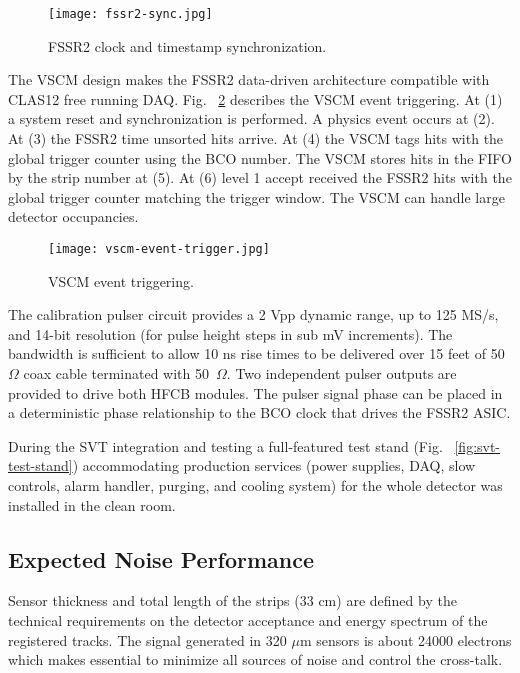 \begin{figure}[hbt] 
\centering 
\texttt{[image: fssr2-sync.jpg]}
\caption{FSSR2 clock and timestamp synchronization.}
\label{fig:fssr2-sync}
\end{figure}

The VSCM design makes the FSSR2 data-driven architecture compatible with CLAS12 free running DAQ. Fig. ~\ref{fig:vscm-event-trigger} describes the VSCM event triggering. At (1) a system reset and synchronization is performed. A physics event occurs at (2). At (3) the FSSR2 time unsorted hits arrive. At (4) the VSCM tags hits with the global trigger counter using the BCO number. The VSCM stores hits in the FIFO by the strip number at (5). At (6) level 1 accept received the FSSR2 hits with the global trigger counter matching the trigger window. The VSCM can handle large detector occupancies.

\begin{figure}[hbt] 
\centering 
\texttt{[image: vscm-event-trigger.jpg]}
\caption{VSCM event triggering.}
\label{fig:vscm-event-trigger}
\end{figure}

The calibration pulser circuit provides a 2 Vpp dynamic range, up to 125 MS/s, and 14-bit resolution (for pulse height steps in sub mV increments). The bandwidth is sufficient to allow 10 ns rise times to be delivered over 15 feet of 50~$\Omega$ coax cable terminated with 50~$\Omega$. Two independent pulser outputs are provided to drive both HFCB modules. The pulser signal phase can be placed in a deterministic phase relationship to the BCO clock that drives the FSSR2 ASIC. 

During the SVT integration and testing a full-featured test stand (Fig. ~\ref{fig:svt-test-stand}) accommodating production services (power supplies, DAQ, slow controls, alarm handler, purging, and cooling system) for the whole detector was installed in the clean room.

\subsection{Expected Noise Performance}

Sensor thickness and total length of the strips (33 cm) are defined by the technical requirements on the detector acceptance and energy spectrum of the registered tracks. The signal generated in 320 $\mu$m sensors is about 24000 electrons which makes essential to minimize all sources of noise and control the cross-talk. 


